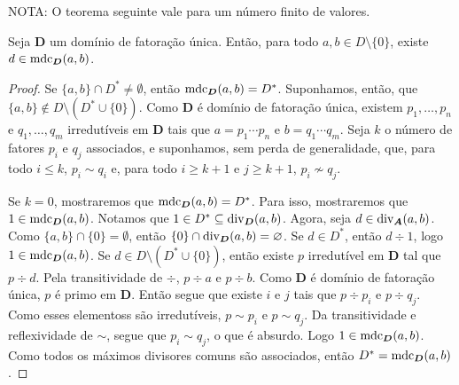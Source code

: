 	NOTA: O teorema seguinte vale para um número finito de valores.
\begin{teo}
	Seja $\bm D$ um domínio de fatoração única. Então, para todo $a,b \in D \setminus \{0\}$, existe $d \in \operatorname{mdc}_{\bm D}(a,b)$.
\end{teo}
\begin{proof}
	Se $\{a,b\} \cap D^* \neq \emptyset$, então $\operatorname{mdc}_{\bm D}(a,b) = D^*$. Suponhamos, então, que $\{a,b\} \notin D \setminus (D^* \cup \{0\})$. Como $\bm D$ é domínio de fatoração única, existem $p_1,\ldots,p_n$ e $q_1,\ldots,q_m$ irredutíveis em $\bm D$ tais que $a = p_1 \cdots p_n$ e $b = q_1 \cdots q_m$. Seja $k$ o número de fatores $p_i$ e $q_j$ associados, e suponhamos, sem perda de generalidade, que, para todo $i \leq k$, $p_i \sim q_i$ e, para todo $i \geq k+1$ e $j\geq k+1$, $p_i \not\sim q_j$.

	Se $k=0$, mostraremos que $\operatorname{mdc}_{\bm D}(a,b) = D^*$. Para isso, mostraremos que $1 \in \operatorname{mdc}_{\bm D}(a,b)$. Notamos que $1 \in D^* \subseteq \operatorname{div}_{\bm D}(a,b)$. Agora, seja $d \in \operatorname{div}_{\bm A}(a,b)$. Como $\{a,b\} \cap \{0\} = \emptyset$, então $\{0\} \cap \operatorname{div}_{\bm D}(a,b) = \varnothing$. Se $d \in D^*$, então $d \div 1$, logo $1 \in \operatorname{mdc}_{\bm D}(a,b)$. Se $d \in D \setminus (D^* \cup \{0\})$, então existe $p$ irredutível em $\bm D$ tal que $p \div d$. Pela transitividade de $\div$, $p \div a$ e $p \div b$. Como $\bm D$ é domínio de fatoração única, $p$ é primo em $\bm D$. Então segue que existe $i$ e $j$ tais que $p \div p_i$ e $p \div q_j$. Como esses elementoss são irredutíveis, $p \sim p_i$ e $p \sim q_j$. Da transitividade e reflexividade de $\sim$, segue que $p_i \sim q_j$, o que é absurdo. Logo $1 \in \operatorname{mdc}_{\bm D}(a,b)$. Como todos os máximos divisores comuns são associados, então $D^* = \operatorname{mdc}_{\bm D}(a,b)$.


\end{proof}
